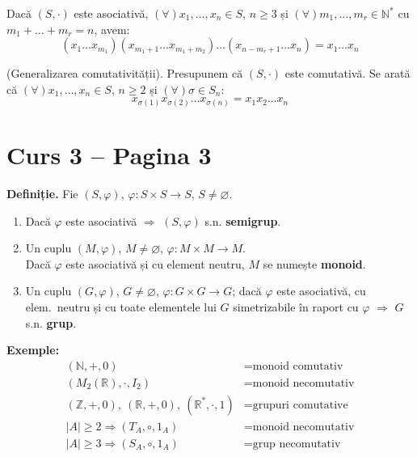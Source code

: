 \begin{corollary}
Dacă $(S, \cdot)$ este asociativă, $(\forall) x_1, \dots, x_n \in S$, $n \ge 3$ și $(\forall) m_1, \dots, m_r \in \mathbb{N}^*$ cu $m_1 + \dots + m_r = n$, avem:
$$ (x_1 \dots x_{m_1})(x_{m_1+1} \dots x_{m_1+m_2}) \dots (x_{n-m_r+1} \dots x_n) = x_1 \dots x_n $$
\end{corollary}

\begin{example}
(Generalizarea comutativității). Presupunem că $(S, \cdot)$ este comutativă. Se arată că $(\forall) x_1, \dots, x_n \in S$, $n \ge 2$ și $(\forall) \sigma \in S_n$:
$$ x_{\sigma(1)} x_{\sigma(2)} \dots x_{\sigma(n)} = x_1 x_2 \dots x_n $$
\end{example}



\section*{Curs 3 -- Pagina 3}

\noindent\textbf{Definiție.} Fie $(S,\varphi)$, $\varphi : S \times S \to S$, $S \neq \varnothing$.

\begin{enumerate}
\item[(1)] Dacă $\varphi$ este asociativă $\Rightarrow$ $(S,\varphi)$ s.n. \textbf{semigrup}.

\item[(2)] Un cuplu $(M,\varphi)$, $M \neq \varnothing$, $\varphi : M \times M \to M$.\\
Dacă $\varphi$ este asociativă și cu element neutru, $M$ se numește \textbf{monoid}.

\item[(3)] Un cuplu $(G,\varphi)$, $G \neq \varnothing$, $\varphi : G \times G \to G$; dacă $\varphi$ este asociativă, cu elem.\ neutru și cu toate elementele lui $G$ simetrizabile în raport cu $\varphi$ $\Rightarrow$ $G$ s.n. \textbf{grup}.
\end{enumerate}

\noindent\textbf{Exemple:}
\begin{align*}
(\mathbb{N},+,0) &= \text{monoid comutativ} \\
(M_2(\mathbb{R}), \cdot, I_2) &= \text{monoid necomutativ} \\
(\mathbb{Z},+,0),\ (\mathbb{R},+,0),\ (\mathbb{R}^*,\cdot,1) &= \text{grupuri comutative} \\
|A| \geq 2 \Rightarrow (T_A,\circ,1_A) &= \text{monoid necomutativ} \\
|A| \geq 3 \Rightarrow (S_A,\circ,1_A) &= \text{grup necomutativ}
\end{align*}

